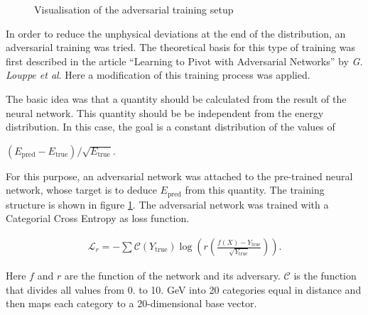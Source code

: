 \documentclass[12pt, a4paper]{thesis}
\begin{document}
\begin{figure}[H]
\caption{Visualisation of the adversarial training setup}
\label{adv-training}
\end{figure}

In order to reduce the unphysical deviations at the end of the
distribution, an adversarial training was tried. The theoretical basis
for this type of training was first described in the article
``Learning to Pivot with Adversarial Networks'' by \emph{G. Louppe et
  al}. Here a modification of this training process was applied.

The basic idea was that a quantity should be calculated from the
result of the neural network. This quantity should be be independent
from the energy distribution. In this case, the goal is a constant
distribution of the values of

\((E_{\text{pred}}-E_{\text{true}})/\sqrt{E_{\text{true}}}\).


For this purpose, an adversarial network was attached to the
pre-trained neural network, whose target is to deduce
\(E_{\text{pred}}\) from this quantity. The training structure is shown
in figure \ref{adv-training}. The adversarial network was trained
with a Categorial Cross Entropy as loss function.

\begin{align}
\mathcal{L}_r = - \sum \mathcal{C}\left(Y_{\text{true}}\right)
\log(r\left(\frac{f(X)-Y_{\text{true}}}{\sqrt{Y_{\text{true}}}}\right)).
\end{align}

Here \(f\) and \(r\) are the function of the network and its
adversary. \(\mathcal{C}\) is the function that divides all values
from 0. to 10. GeV into 20 categories equal in distance and then maps
each category to a 20-dimensional base vector.
\end{document}

